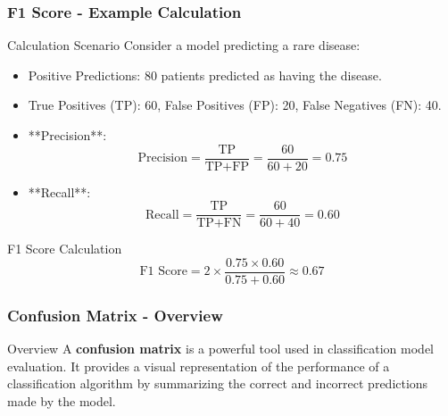 \documentclass[aspectratio=169]{beamer}
\begin{document}
\begin{frame}[fragile]
    \frametitle{F1 Score - Example Calculation}
    \begin{block}{Calculation Scenario}
        Consider a model predicting a rare disease:
        \begin{itemize}
            \item Positive Predictions: 80 patients predicted as having the disease.
            \item True Positives (TP): 60, False Positives (FP): 20, False Negatives (FN): 40.
        \end{itemize}
    \end{block}
    \begin{itemize}
        \item **Precision**: 
        \[
        \text{Precision} = \frac{\text{TP}}{\text{TP} + \text{FP}} = \frac{60}{60 + 20} = 0.75
        \]
        \item **Recall**: 
        \[
        \text{Recall} = \frac{\text{TP}}{\text{TP} + \text{FN}} = \frac{60}{60 + 40} = 0.60
        \]
    \end{itemize}
    \begin{block}{F1 Score Calculation}
        \[
        \text{F1 Score} = 2 \times \frac{0.75 \times 0.60}{0.75 + 0.60} \approx 0.67
        \]
    \end{block}
\end{frame}

\begin{frame}[fragile]
    \frametitle{Confusion Matrix - Overview}
    \begin{block}{Overview}
        A \textbf{confusion matrix} is a powerful tool used in classification model evaluation. 
        It provides a visual representation of the performance of a classification algorithm by summarizing the correct and incorrect predictions made by the model.
    \end{block}
\end{frame}
\end{document}
